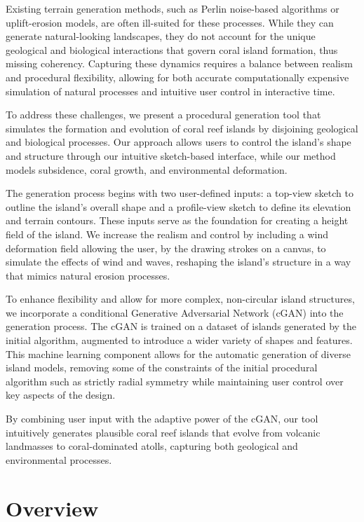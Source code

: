 Existing terrain generation methods, such as Perlin noise-based algorithms or uplift-erosion models, are often ill-suited for these processes. While they can generate natural-looking landscapes, they do not account for the unique geological and biological interactions that govern coral island formation, thus missing coherency. Capturing these dynamics requires a balance between realism and procedural flexibility, allowing for both accurate computationally expensive simulation of natural processes and intuitive user control in interactive time.

%

To address these challenges, we present a procedural generation tool that simulates the formation and evolution of coral reef islands by disjoining geological and biological processes. Our approach allows users to control the island's shape and structure through our intuitive sketch-based interface, while our method models subsidence, coral growth, and environmental deformation.

The generation process begins with two user-defined inputs: a top-view sketch to outline the island's overall shape and a profile-view sketch to define its elevation and terrain contours. These inputs serve as the foundation for creating a height field of the island. We increase the realism and control by including a wind deformation field allowing the user, by the drawing strokes on a canvas, to simulate the effects of wind and waves, reshaping the island's structure in a way that mimics natural erosion processes.

To enhance flexibility and allow for more complex, non-circular island structures, we incorporate a conditional Generative Adversarial Network (cGAN) into the generation process. The cGAN is trained on a dataset of islands generated by the initial algorithm, augmented to introduce a wider variety of shapes and features. This machine learning component allows for the automatic generation of diverse island models, removing some of the constraints of the initial procedural algorithm such as strictly radial symmetry while maintaining user control over key aspects of the design.

By combining user input with the adaptive power of the cGAN, our tool intuitively generates plausible coral reef islands that evolve from volcanic landmasses to coral-dominated atolls, capturing both geological and environmental processes.



\section{Overview}

